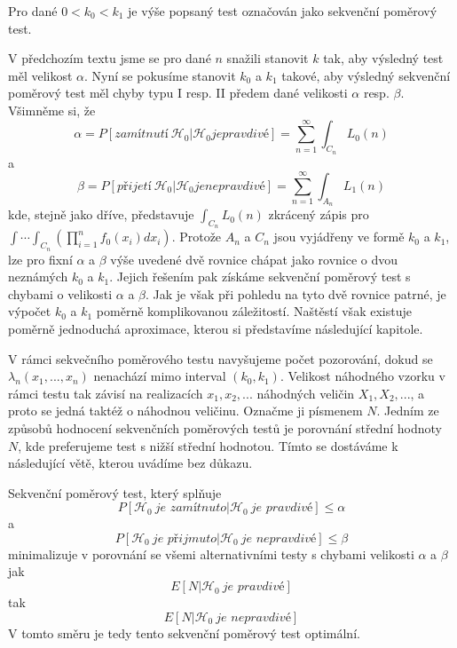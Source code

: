 \begin{definition}
Pro dané $0 < k_0 < k_1$ je výše popsaný test označován jako sekvenční poměrový test.
\end{definition}

V předchozím textu jsme se pro dané $n$ snažili stanovit $k$ tak, aby výsledný test měl velikost $\alpha$. Nyní se pokusíme stanovit $k_0$ a $k_1$ takové, aby výsledný sekvenční poměrový test měl chyby typu I resp. II předem dané velikosti $\alpha$ resp. $\beta$. Všimněme si, že
\begin{equation*}
\alpha = P[\textit{zamítnutí} ~ \mathscr{H}_0 | \mathscr{H}_0 je pravdivé] = \sum_{n = 1}^{\infty} \int_{C_n} L_0(n)
\end{equation*}
a
\begin{equation*}
\beta = P[\textit{přijetí} ~ \mathscr{H}_0 | \mathscr{H}_0 je nepravdivé] = \sum_{n = 1}^{\infty} \int_{A_n} L_1(n)
\end{equation*}
kde, stejně jako dříve, představuje $\int_{C_n} L_0(n)$ zkrácený zápis pro $\int \cdots \int_{C_n}\left(\prod_{i = 1}^n f_0(x_i)dx_i\right)$. Protože $A_n$ a $C_n$ jsou vyjádřeny ve formě $k_0$ a $k_1$, lze pro fixní $\alpha$ a $\beta$ výše uvedené dvě rovnice chápat jako rovnice o dvou neznámých $k_0$ a $k_1$. Jejich řešením pak získáme sekvenční poměrový test s chybami o velikosti $\alpha$ a $\beta$. Jak je však při pohledu na tyto dvě rovnice patrné, je výpočet $k_0$ a $k_1$ poměrně komplikovanou záležitostí. Naštěstí však existuje poměrně jednoduchá aproximace, kterou si představíme následující kapitole.

V rámci sekvečního poměrového testu navyšujeme počet pozorování, dokud se $\lambda_n(x_1, ..., x_n)$ nenachází mimo interval $(k_0, k_1)$. Velikost náhodného vzorku v rámci testu tak závisí na realizacích $x_1, x_2, ...$ náhodných veličin $X_1, X_2, ...$, a proto se jedná taktéž o náhodnou veličinu. Označme ji písmenem $N$. Jedním ze způsobů hodnocení sekvenčních poměrových testů je porovnání střední hodnoty $N$, kde preferujeme test s nižší střední hodnotou. Tímto se dostáváme k následující větě, kterou uvádíme bez důkazu.

\begin{theorem}
Sekvenční poměrový test, který splňuje
\begin{equation*}
P[\mathscr{H}_0 ~ \textit{je zamítnuto}| \mathscr{H_0} ~ \textit{je pravdivé}] \le \alpha
\end{equation*}
a
\begin{equation*}
P[\mathscr{H}_0 ~ \textit{je přijmuto}| \mathscr{H_0} ~ \textit{je nepravdivé}] \le \beta
\end{equation*}
minimalizuje v porovnání se všemi alternativními testy s chybami velikosti $\alpha$ a $\beta$ jak
\begin{equation*}
E[N|\mathscr{H}_0 ~ \textit{je pravdivé}]
\end{equation*}
tak
\begin{equation*}
E[N|\mathscr{H}_0 ~ \textit{je nepravdivé}]
\end{equation*}
V tomto směru je tedy tento sekvenční poměrový test optimální.
\end{theorem}

